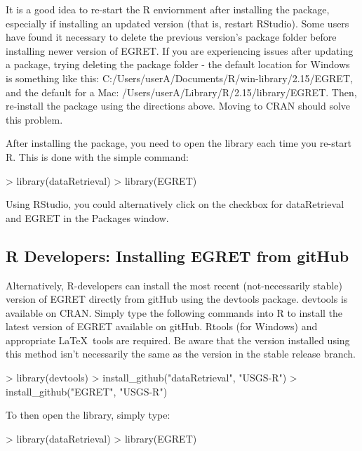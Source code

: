 \documentclass[a4paper,11pt]{article}
\begin{document}
It is a good idea to re-start the R enviornment after installing the package, especially if installing an updated version (that is, restart RStudio). Some users have found it necessary to delete the previous version's package folder before installing newer version of EGRET. If you are experiencing issues after updating a package, trying deleting the package folder - the default location for Windows is something like this: C:/Users/userA/Documents/R/win-library/2.15/EGRET, and the default for a Mac: /Users/userA/Library/R/2.15/library/EGRET. Then, re-install the package using the directions above. Moving to CRAN should solve this problem.

After installing the package, you need to open the library each time you re-start R.  This is done with the simple command:
\begin{Schunk}
\begin{Sinput}
> library(dataRetrieval)
> library(EGRET)
\end{Sinput}
\end{Schunk}
Using RStudio, you could alternatively click on the checkbox for dataRetrieval and EGRET in the Packages window.

\subsection{R Developers: Installing EGRET from gitHub}
Alternatively, R-developers can install the most recent (not-necessarily stable) version of EGRET directly from gitHub using the devtools package.  devtools is available on CRAN.  Simply type the following commands into R to install the latest version of EGRET available on gitHub.  Rtools (for Windows) and appropriate \LaTeX\ tools are required. Be aware that the version installed using this method isn't necessarily the same as the version in the stable release branch.  


\begin{Schunk}
\begin{Sinput}
> library(devtools)
> install_github("dataRetrieval", "USGS-R")
> install_github("EGRET", "USGS-R")
\end{Sinput}
\end{Schunk}
To then open the library, simply type:

\begin{Schunk}
\begin{Sinput}
> library(dataRetrieval)
> library(EGRET)
\end{Sinput}
\end{Schunk}
\end{document}
